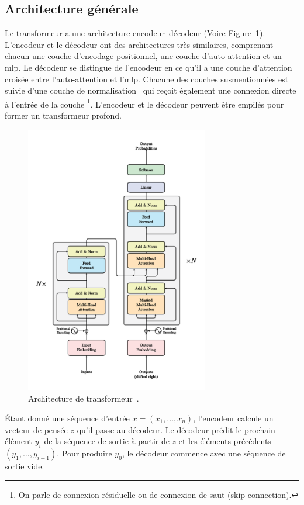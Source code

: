 \subsection{Architecture générale}

Le transformeur a une architecture encodeur--décodeur (Voire Figure~\ref{fig.transformer}).
L'encodeur et le décodeur ont des architectures très similaires, 
comprenant chacun une couche d'encodage positionnel, une couche d'auto-attention et un \gls{mlp}.
Le décodeur se distingue de l'encodeur 
en ce qu'il a une couche d'attention croisée entre l'auto-attention et l'\gls{mlp}.
Chacune des couches susmentionnées est suivie d'une couche de normalisation~\cite{Ba_Kiros_Hinton_2016}
qui reçoit également une connexion directe à l'entrée de la couche%
\footnote{%
    On parle de connexion résiduelle ou de connexion de saut \foreignlanguage{english}{(skip connection)}.
}.
L'encodeur et le décodeur peuvent être empilés pour former un transformeur profond.

\begin{figure}[htb]
    \centering
    \includegraphics[width=8cm]{assets/images/transformer.png}
    \caption[L'architecture de transformeur.]
    {Architecture de transformeur~\cite[Fig 1]{attention}.}
    \label{fig.transformer}
\end{figure}

Étant donné une séquence d'entrée \(x = (x_1, \ldots, x_n)\),
l'encodeur calcule un vecteur de pensée \(z\) qu'il passe au décodeur.
Le décodeur prédit le prochain élément \(y_i\) de la séquence de sortie 
à partir de \(z\) et les éléments précédents \((y_1, \ldots, y_{i-1})\).
Pour produire \(y_0\), le décodeur commence avec une séquence de sortie vide.
